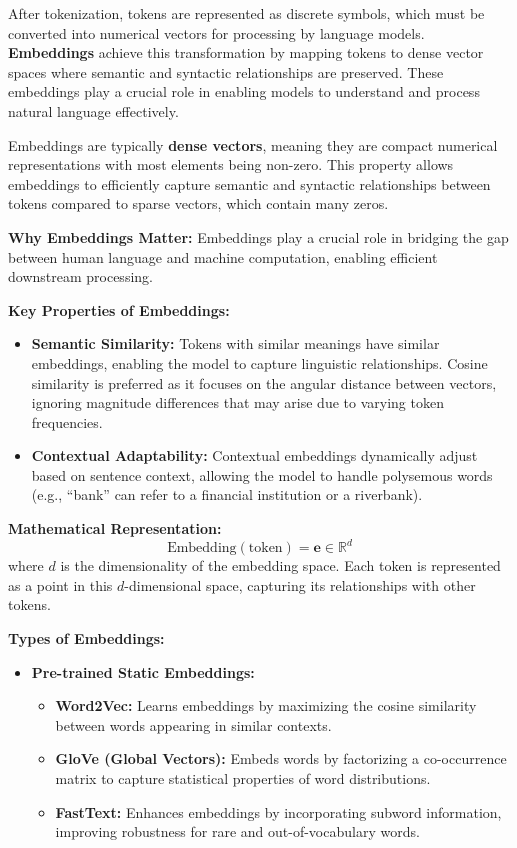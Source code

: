 \begin{flushleft}
    \large After tokenization, tokens are represented as discrete symbols, which must be converted into numerical vectors for processing by language models. \textbf{Embeddings} achieve this transformation by mapping tokens to dense vector spaces where semantic and syntactic relationships are preserved. These embeddings play a crucial role in enabling models to understand and process natural language effectively. \break

    Embeddings are typically \textbf{dense vectors}, meaning they are compact numerical representations with most elements being non-zero. This property allows embeddings to efficiently capture semantic and syntactic relationships between tokens compared to sparse vectors, which contain many zeros. \break

    \textbf{Why Embeddings Matter:}
    Embeddings play a crucial role in bridging the gap between human language and machine computation, enabling efficient downstream processing. \break

    \textbf{Key Properties of Embeddings:}
    \begin{itemize}
        \item \textbf{Semantic Similarity:} Tokens with similar meanings have similar embeddings, enabling the model to capture linguistic relationships. Cosine similarity is preferred as it focuses on the angular distance between vectors, ignoring magnitude differences that may arise due to varying token frequencies.
        \item \textbf{Contextual Adaptability:} Contextual embeddings dynamically adjust based on sentence context, allowing the model to handle polysemous words (e.g., ``bank'' can refer to a financial institution or a riverbank).
    \end{itemize} \break

    \textbf{Mathematical Representation:}
    \[
    \text{Embedding}(\text{token}) = \mathbf{e} \in \mathbb{R}^d
    \]
    where \(d\) is the dimensionality of the embedding space. Each token is represented as a point in this \(d\)-dimensional space, capturing its relationships with other tokens. \break

    \textbf{Types of Embeddings:}
    \begin{itemize}
        \item \textbf{Pre-trained Static Embeddings:}
        \begin{itemize}
            \item \textbf{Word2Vec:} Learns embeddings by maximizing the cosine similarity between words appearing in similar contexts.
            \item \textbf{GloVe (Global Vectors):} Embeds words by factorizing a co-occurrence matrix to capture statistical properties of word distributions.
            \item \textbf{FastText:} Enhances embeddings by incorporating subword information, improving robustness for rare and out-of-vocabulary words.
        \end{itemize}


\end{itemize}
\end{flushleft}
